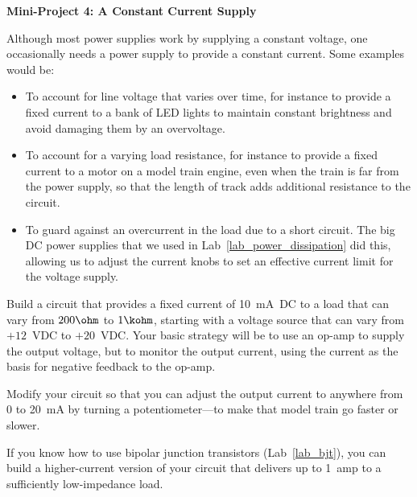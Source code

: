 \bigskip
\textbf{Mini-Project 4: A Constant Current Supply}

Although most power supplies work by supplying a constant voltage, one occasionally needs a power supply to provide a constant current.  Some examples would be:
\begin{itemize}
\item To account for line voltage that varies over time, for instance to provide a fixed current to a bank of LED lights to maintain constant brightness and avoid damaging them by an overvoltage.
\item To account for a varying load resistance, for instance to provide a fixed current to a motor on a model train engine, even when the train is far from the power supply, so that the length of track adds additional resistance to the circuit.
\item To  guard against an overcurrent in the load due to a short circuit. The big DC power supplies that we used in Lab~\ref{lab_power_dissipation} did this, allowing us to adjust the current knobs to set an effective current limit for the voltage supply.
\end{itemize}

Build a circuit that provides a fixed current of 10~mA~DC to a load that can vary from $200\ohm$ to $1\kohm$, starting with a voltage source that can vary from $+12$~VDC to $+20$~VDC.  Your basic strategy will be to use an op-amp to supply the output voltage, but to monitor the output current, using the current as the basis for negative feedback to the op-amp.

Modify your circuit so that you can adjust the output current to anywhere from 0 to 20~mA by turning a potentiometer---to make that model train go faster or slower.

If you know how to use bipolar junction transistors (Lab~\ref{lab_bjt}), you can build a higher-current version of your circuit that delivers up to 1~amp to a sufficiently low-impedance load. 
 


